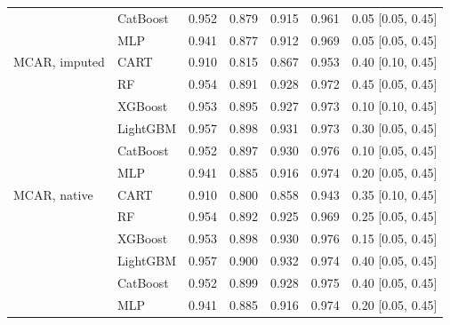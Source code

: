 \documentclass[pdflatex,sn-mathphys]{sn-jnl}
\theoremstyle{thmstyleone}
\begin{document}
\begin{table}[htbp]
\begin{tabular}{@{}llrrrrl@{}}
 & CatBoost & 0.952 & 0.879 & 0.915 & 0.961 & 0.05 [0.05, 0.45] \\
 & MLP & 0.941 & 0.877 & 0.912 & 0.969 & 0.05 [0.05, 0.45] \\
\midrule
MCAR, imputed & CART & 0.910 & 0.815 & 0.867 & 0.953 & 0.40 [0.10, 0.45] \\
 & RF & 0.954 & 0.891 & 0.928 & 0.972 & 0.45 [0.05, 0.45] \\
 & XGBoost & 0.953 & 0.895 & 0.927 & 0.973 & 0.10 [0.10, 0.45] \\
 & LightGBM & 0.957 & 0.898 & 0.931 & 0.973 & 0.30 [0.05, 0.45] \\
 & CatBoost & 0.952 & 0.897 & 0.930 & 0.976 & 0.10 [0.05, 0.45] \\
 & MLP & 0.941 & 0.885 & 0.916 & 0.974 & 0.20 [0.05, 0.45] \\
\midrule
MCAR, native & CART & 0.910 & 0.800 & 0.858 & 0.943 & 0.35 [0.10, 0.45] \\
 & RF & 0.954 & 0.892 & 0.925 & 0.969 & 0.25 [0.05, 0.45] \\
 & XGBoost & 0.953 & 0.898 & 0.930 & 0.976 & 0.15 [0.05, 0.45] \\
 & LightGBM & 0.957 & 0.900 & 0.932 & 0.974 & 0.40 [0.05, 0.45] \\
 & CatBoost & 0.952 & 0.899 & 0.928 & 0.975 & 0.40 [0.05, 0.45] \\
 & MLP & 0.941 & 0.885 & 0.916 & 0.974 & 0.20 [0.05, 0.45] \\
\bottomrule
\end{tabular}
\end{table}
\end{document}
